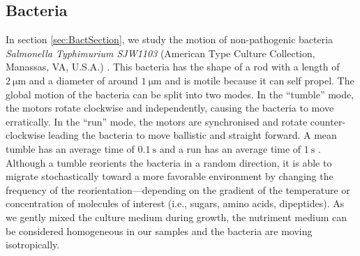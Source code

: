 \documentclass[prb,reprint,amsmath,amssymb]{revtex4-1}
\newcommand{\tg}[1]{{\color{magenta}#1}} %
\begin{document}
\subsection{Bacteria}
In section \ref{sec:BactSection}, we study the motion of non-pathogenic bacteria \tg{\textit{Salmonella Typhimurium SJW1103}  (American Type Culture Collection, Manassas, VA, U.S.A.)} \citep{21_fabrega2013salmonella}. \tg{This bacteria has the shape of a rod with a length of $\SI{2}{\micro\meter}$ and a diameter of around $\SI{1}{\micro\meter}$ and is motile because it can self propel. The global motion of the bacteria can be split into two modes. In the ``tumble'' mode, the motors rotate clockwise and independently, causing the bacteria to move erratically. In the ``run'' mode, the motors are synchronised and rotate counter-clockwise leading the bacteria to move ballistic and straight forward. A mean tumble has an average time of $\SI{0.1}{\second}$ and a run has an average time of $\SI{1}{\second}$ \citep{5_berg2000motile}. Although a tumble reorients the bacteria in a random direction, it is able to migrate stochastically toward a more favorable environment by changing the frequency of the reorientation—depending on the gradient of the temperature or concentration of molecules of interest (i.e., sugars, amino acids, dipeptides). As we gently mixed the culture medium during growth, the nutriment medium can be considered homogeneous in our samples and the bacteria are moving isotropically.}
\end{document}
